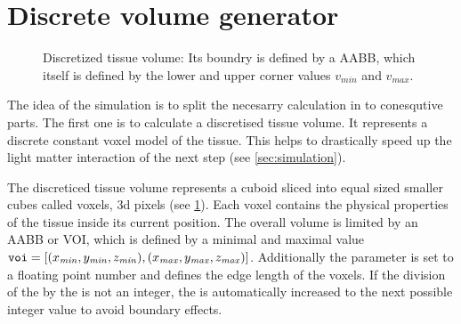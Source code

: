 \section{Discrete volume generator}
\label{sec:dv_generator}
%
\begin{figure}[!t]
\centering
\setlength{\tikzwidth}{0.5\textwidth}
\caption[discreticed tissue volume]{Discretized tissue volume: Its boundry is defined by a \ac{AABB}, which itself is defined by the lower and upper corner values $v_\mathit{min}$ and $v_\mathit{max}$. }
\label{fig:discVol}
\end{figure}
%
The idea of the simulation is to split the necesarry calculation in to conesqutive parts. The first one is to calculate a discretised tissue volume.
It represents a discrete constant voxel model of the tissue.
This helps to drastically speed up the light matter interaction of the next step (see \cref{sec:simulation}).
\par
%
The discreticed tissue volume represents a cuboid sliced into equal sized smaller cubes called voxels, \ie 3d pixels (see \cref{fig:discVol}).
Each voxel contains the physical properties of the tissue inside its current position.
The overall volume is limited by an \ac{AABB} or \ac{VOI}, which is defined by a minimal and maximal value $\texttt{voi} = [(x_{\mathit{min}}, y_{\mathit{min}}, z_{\mathit{min}}),(x_{\mathit{max}}, y_{\mathit{max}}, z_{\mathit{max}})]$.
Additionally the \Voxelsize{} parameter \voxelsize{} is set to a floating point number and defines the edge length of the voxels.
If the division of the \voi{} by the \Voxelsize{} is not an integer, the \voi{} is automatically increased to the next possible integer value to avoid boundary effects.
%
%
%
